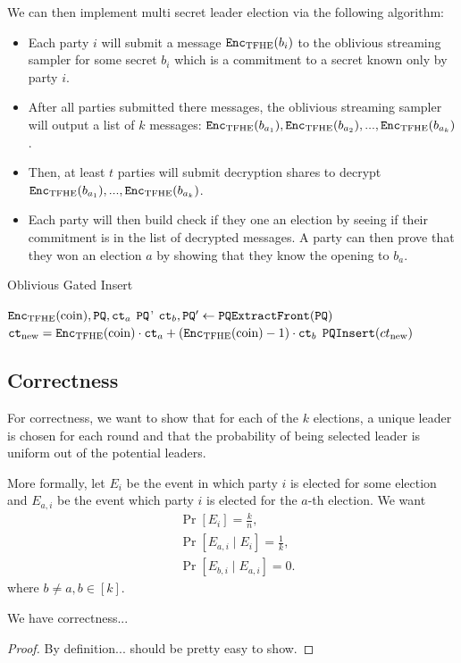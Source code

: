 We can then implement multi secret leader election via the following algorithm:
\begin{itemize}
	\item Each party $i$ will submit a message $\texttt{Enc}_{\mathrm{TFHE}}(b_i)$ to the oblivious streaming sampler for some secret $b_i$ which is a commitment to a secret known only by party $i$.
	\item After all parties submitted there messages, the oblivious streaming sampler will output a list of $k$ messages: $\texttt{Enc}_{\mathrm{TFHE}}(b_{a_1}), \texttt{Enc}_{\mathrm{TFHE}}(b_{a_2}), ..., \texttt{Enc}_{\mathrm{TFHE}}(b_{a_k})$.
	\item Then, at least $t$ parties will submit decryption shares to decrypt $\texttt{Enc}_{\mathrm{TFHE}}(b_{a_1}), ..., \texttt{Enc}_{\mathrm{TFHE}}(b_{a_k})$.
	\item Each party will then build check if they one an election by seeing if their commitment is in the list of decrypted messages.
	A party can then prove that they won an election $a$ by showing that they know the opening to $b_a$.
\end{itemize}

\begin{algorithm}
	\caption{Oblivious Gated Insert}
	\label{alg:ObIns}
	\begin{algorithmic}
		\Require $\texttt{Enc}_{\mathrm{TFHE}}(\text{coin}), \texttt{PQ}, \texttt{ct}_a$
		\Ensure $\texttt{PQ}$'
		\State $\texttt{ct}_b, \texttt{PQ}' \gets \texttt{PQExtractFront}(\texttt{PQ})$
		\State $\texttt{ct}_{\text{new}} = \texttt{Enc}_{\mathrm{TFHE}}(\text{coin}) \cdot \texttt{ct}_a + (\texttt{Enc}_{\mathrm{TFHE}}(\text{coin}) - 1) \cdot \texttt{ct}_b$
		\State \Return $\texttt{PQInsert}(ct_{\text{new}})$
	\end{algorithmic}
\end{algorithm}


\subsection{Correctness}
For correctness, we want to show that for each of the $k$ elections, a unique leader is chosen for each round
and that the probability of being selected leader is uniform out of the potential leaders.

More formally, let $E_i$ be the event in which party $i$ is elected for some election and
$E_{a, i}$ be the event which party $i$ is elected for the $a$-th election. We want 
\begin{align}
	&\Pr\left[E_i\right] = \frac{k}{n},\\
	&\Pr\left[E_{a, i} \mid E_i\right] = \frac{1}{k},\\
	&\Pr\left[E_{b, i} \mid E_{a, i}\right] = 0.
\end{align}
where $b \neq a, b \in [k]$.
\begin{theorem}[Correctness]
We have correctness...	
\begin{proof}
	By definition... should be pretty easy to show.
\end{proof}
\end{theorem}
